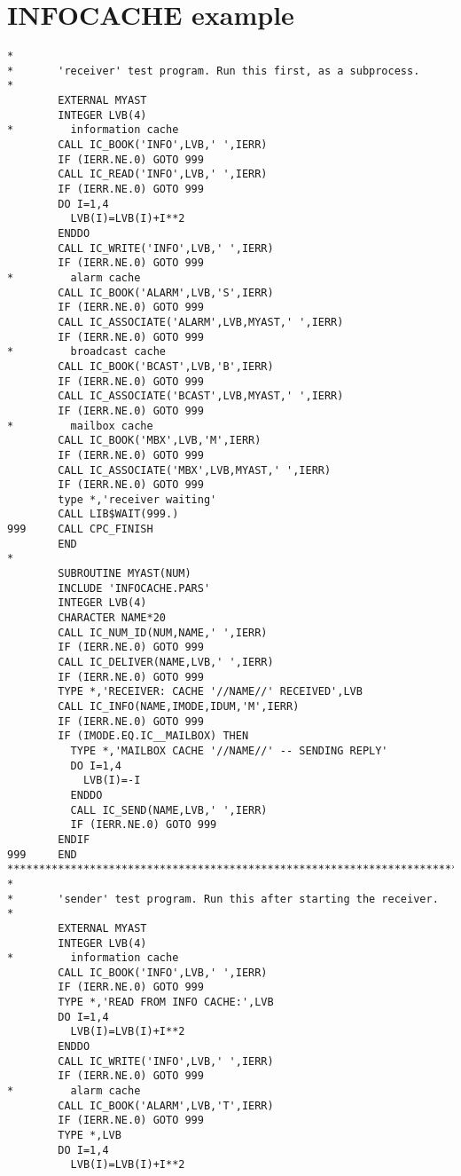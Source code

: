 \section{INFOCACHE example}
\begin{verbatim}
*
*       'receiver' test program. Run this first, as a subprocess.
*
        EXTERNAL MYAST
        INTEGER LVB(4)
*         information cache
        CALL IC_BOOK('INFO',LVB,' ',IERR)
        IF (IERR.NE.0) GOTO 999
        CALL IC_READ('INFO',LVB,' ',IERR)
        IF (IERR.NE.0) GOTO 999
        DO I=1,4
          LVB(I)=LVB(I)+I**2
        ENDDO
        CALL IC_WRITE('INFO',LVB,' ',IERR)
        IF (IERR.NE.0) GOTO 999
*         alarm cache
        CALL IC_BOOK('ALARM',LVB,'S',IERR)
        IF (IERR.NE.0) GOTO 999
        CALL IC_ASSOCIATE('ALARM',LVB,MYAST,' ',IERR)
        IF (IERR.NE.0) GOTO 999
*         broadcast cache
        CALL IC_BOOK('BCAST',LVB,'B',IERR)
        IF (IERR.NE.0) GOTO 999
        CALL IC_ASSOCIATE('BCAST',LVB,MYAST,' ',IERR)
        IF (IERR.NE.0) GOTO 999
*         mailbox cache
        CALL IC_BOOK('MBX',LVB,'M',IERR)
        IF (IERR.NE.0) GOTO 999
        CALL IC_ASSOCIATE('MBX',LVB,MYAST,' ',IERR)
        IF (IERR.NE.0) GOTO 999
        type *,'receiver waiting'
        CALL LIB$WAIT(999.)
999     CALL CPC_FINISH
        END
*
        SUBROUTINE MYAST(NUM)
        INCLUDE 'INFOCACHE.PARS'
        INTEGER LVB(4)
        CHARACTER NAME*20
        CALL IC_NUM_ID(NUM,NAME,' ',IERR)
        IF (IERR.NE.0) GOTO 999
        CALL IC_DELIVER(NAME,LVB,' ',IERR)
        IF (IERR.NE.0) GOTO 999
        TYPE *,'RECEIVER: CACHE '//NAME//' RECEIVED',LVB
        CALL IC_INFO(NAME,IMODE,IDUM,'M',IERR)
        IF (IERR.NE.0) GOTO 999
        IF (IMODE.EQ.IC__MAILBOX) THEN
          TYPE *,'MAILBOX CACHE '//NAME//' -- SENDING REPLY'
          DO I=1,4
            LVB(I)=-I
          ENDDO
          CALL IC_SEND(NAME,LVB,' ',IERR)
          IF (IERR.NE.0) GOTO 999
        ENDIF
999     END
************************************************************************
*
*       'sender' test program. Run this after starting the receiver.
*
        EXTERNAL MYAST
        INTEGER LVB(4)
*         information cache
        CALL IC_BOOK('INFO',LVB,' ',IERR)
        IF (IERR.NE.0) GOTO 999
        TYPE *,'READ FROM INFO CACHE:',LVB
        DO I=1,4
          LVB(I)=LVB(I)+I**2
        ENDDO
        CALL IC_WRITE('INFO',LVB,' ',IERR)
        IF (IERR.NE.0) GOTO 999
*         alarm cache
        CALL IC_BOOK('ALARM',LVB,'T',IERR)
        IF (IERR.NE.0) GOTO 999
        TYPE *,LVB
        DO I=1,4
          LVB(I)=LVB(I)+I**2

\end{verbatim}
